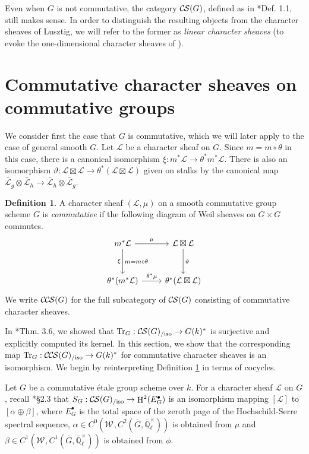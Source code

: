 \documentclass[10pt]{amsart}
\theoremstyle{plain}
\theoremstyle{definition}
\newtheorem{definition}[theorem]{Definition}
\newcommand{\EE}{\mathbb{\bar Q}_\ell}
\newcommand{\EEx}{\EE^\times}
\newcommand{\Weil}[1]{\mathcal{W}_{#1}}
\DeclareMathOperator{\Hh}{H}
\newcommand{\TrFrob}[1]{\operatorname{Tr}_{#1}}
\newcommand{\cs}[1]{{\mathcal{#1}}}
\newcommand{\gcs}[1]{{\mathcal{\bar #1}}}
\newcommand{\CS}{{\mathcal{C\hskip-0.8pt S}}}
\newcommand{\CCS}{{\mathcal{C\hskip-.8pt C\hskip-0.8pt S}}}
\newcommand{\CSiso}[1]{\CS(#1)_{/\text{iso}}}
\newcommand{\CCSiso}[1]{\CCS(#1)_{/\text{iso}}}
\newcommand{\bG}{\bar{G}}
\begin{document}
Even when $G$ is not commutative, the category $\CS(G)$, defined as in \cite{cunningham-roe:13a}*{Def. 1.1},
still makes sense.  In order to distinguish the resulting objects from
the character sheaves of Lusztig, we will refer to the former as \emph{linear character sheaves}
(to evoke the one-dimensional character sheaves of \cite{kamgarpour:09a}).

\section{Commutative character sheaves on commutative groups}\label{sec:comcom}

We consider first the case that $G$ is commutative, which we will later apply to the case of general smooth $G$.
Let $\cs{L}$ be a character sheaf on $G$.  Since $m = m \circ \theta$ in this case,
there is a canonical isomorphism $\xi : m^* \cs{L} \to \theta^* m^* \cs{L}$.
There is also an isomorphism $\vartheta : \cs{L}\boxtimes\cs{L} \to \theta^*(\cs{L}\boxtimes\cs{L})$
given on stalks by the canonical map $\gcs{L}_{g} \otimes \gcs{L}_{h} \to \gcs{L}_{h} \otimes \gcs{L}_{g}$.

\begin{definition}\label{def:CCScom}
A character sheaf $(\cs{L}, \mu)$ on a smooth commutative group scheme $G$ is \emph{commutative}
if the following diagram of Weil sheaves on $G \times G$ commutes.
  \[
  \begin{tikzcd}[row sep=30]
   m^*\cs{L} \arrow{d}[swap]{\xi}{m= m\circ\theta} \arrow{r}{\mu} & \cs{L}\boxtimes\cs{L} \arrow{d}{\vartheta}\\
   \theta^*(m^*\cs{L}) \arrow{r}{{\theta}^*\mu} &  \theta^*(\cs{L}\boxtimes\cs{L})
  \end{tikzcd}
  \]
We write $\CCS(G)$ for the full subcategory of $\CS(G)$ consisting of commutative character sheaves.
 \end{definition}

In \cite{cunningham-roe:13a}*{Thm. 3.6}, we showed that $\TrFrob{G} : \CSiso{G} \to G(k)^*$ is surjective and
explicitly computed its kernel.  In this section, we show that the corresponding map
$\TrFrob{G} : \CCSiso{G} \to G(k)^*$ for commutative character sheaves is an isomorphism.
We begin by reinterpreting Definition \ref{def:CCScom} in terms of cocycles.

Let $G$ be a commutative \'etale group scheme over $k$. For a character sheaf $\cs{L}$ on $G$, recall
\cite{cunningham-roe:13a}*{\S 2.3} that $S_G : \CSiso{G} \to \Hh^2(E_G^\bullet)$ is an isomorphism mapping
$[\cs{L}]$ to $[\alpha \oplus \beta]$, where $E_G^\bullet$ is the total space of the zeroth page
of the Hochschild-Serre spectral sequence, $\alpha \in C^0(\Weil{}, C^2(\bG, \EEx))$ is obtained from $\mu$ and
$\beta \in C^1(\Weil{}, C^1(\bG, \EEx))$ is obtained from $\phi$.
\end{document}
